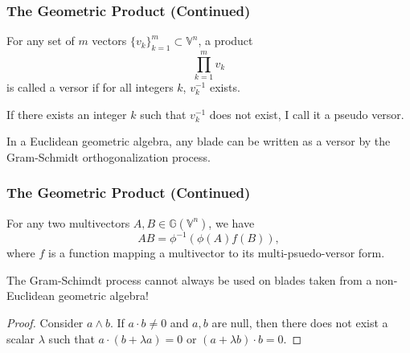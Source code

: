 \documentclass{beamer}
\newcommand{\G}{\mathbb{G}}
\newcommand{\V}{\mathbb{V}}
\begin{document}
%

\begin{frame}
\frametitle{The Geometric Product (Continued)}
\begin{definition}
For any set of $m$ vectors $\{v_k\}_{k=1}^m\subset\V^n$, a product
\begin{equation*}
\prod_{k=1}^m v_k
\end{equation*}
is called a versor if for all integers $k$, $v_k^{-1}$ exists.
\end{definition}
If there exists an integer $k$ such that $v_k^{-1}$ does not exist, I call it a pseudo versor.
\begin{lemma}
In a \alert{Euclidean} geometric algebra, any blade can be written as a versor
by the Gram-Schmidt orthogonalization process.
\end{lemma}
\end{frame}

\begin{frame}
\frametitle{The Geometric Product (Continued)}
\begin{example}
For any two multivectors $A,B\in\G(\V^n)$, we have
\begin{equation*}
AB = \phi^{-1}(\phi(A)f(B)),
\end{equation*}
where $f$ is a function mapping a multivector to its multi-psuedo-versor form.
\end{example}
\begin{lemma}
The Gram-Schimdt process cannot always be used on blades taken from
a \alert{non-Euclidean} geometric algebra!
\end{lemma}
\begin{proof}
Consider $a\wedge b$.  If $a\cdot b\neq 0$ and $a,b$ are null, then there does not exist a
scalar $\lambda$ such that $a\cdot(b+\lambda a)=0$ or $(a+\lambda b)\cdot b=0$.
\end{proof}
\end{frame}
\end{document}
